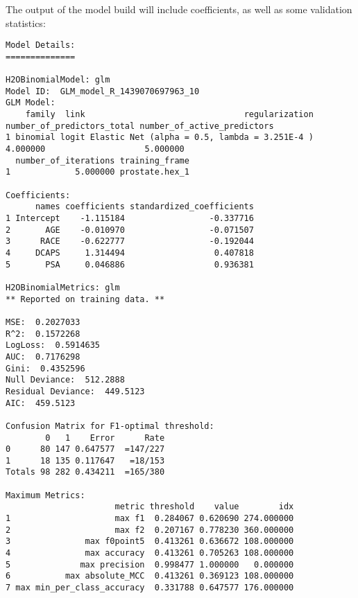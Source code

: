 The output of the model build will include coefficients, as well as some validation statistics:
\begin{lstlisting}[style=output]
Model Details:
==============

H2OBinomialModel: glm
Model ID:  GLM_model_R_1439070697963_10 
GLM Model:
    family  link                                regularization number_of_predictors_total number_of_active_predictors
1 binomial logit Elastic Net (alpha = 0.5, lambda = 3.251E-4 )                   4.000000                    5.000000
  number_of_iterations training_frame
1             5.000000 prostate.hex_1

Coefficients:
      names coefficients standardized_coefficients
1 Intercept    -1.115184                 -0.337716
2       AGE    -0.010970                 -0.071507
3      RACE    -0.622777                 -0.192044
4     DCAPS     1.314494                  0.407818
5       PSA     0.046886                  0.936381

H2OBinomialMetrics: glm
** Reported on training data. **

MSE:  0.2027033
R^2:  0.1572268
LogLoss:  0.5914635
AUC:  0.7176298
Gini:  0.4352596
Null Deviance:  512.2888
Residual Deviance:  449.5123
AIC:  459.5123

Confusion Matrix for F1-optimal threshold:
        0   1    Error      Rate
0      80 147 0.647577  =147/227
1      18 135 0.117647   =18/153
Totals 98 282 0.434211  =165/380

Maximum Metrics:
                      metric threshold    value        idx
1                     max f1  0.284067 0.620690 274.000000
2                     max f2  0.207167 0.778230 360.000000
3               max f0point5  0.413261 0.636672 108.000000
4               max accuracy  0.413261 0.705263 108.000000
5              max precision  0.998477 1.000000   0.000000
6           max absolute_MCC  0.413261 0.369123 108.000000
7 max min_per_class_accuracy  0.331788 0.647577 176.000000
\end{lstlisting}

